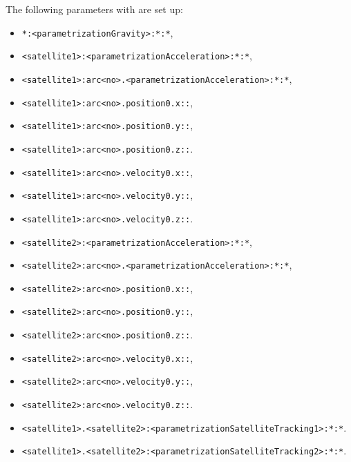 The following parameters with  are set up:
\begin{itemize}
\item \verb|*:<parametrizationGravity>:*:*|,
\item \verb|<satellite1>:<parametrizationAcceleration>:*:*|,
\item \verb|<satellite1>:arc<no>.<parametrizationAcceleration>:*:*|,
\item \verb|<satellite1>:arc<no>.position0.x::|,
\item \verb|<satellite1>:arc<no>.position0.y::|,
\item \verb|<satellite1>:arc<no>.position0.z::|.
\item \verb|<satellite1>:arc<no>.velocity0.x::|,
\item \verb|<satellite1>:arc<no>.velocity0.y::|,
\item \verb|<satellite1>:arc<no>.velocity0.z::|.
\item \verb|<satellite2>:<parametrizationAcceleration>:*:*|,
\item \verb|<satellite2>:arc<no>.<parametrizationAcceleration>:*:*|,
\item \verb|<satellite2>:arc<no>.position0.x::|,
\item \verb|<satellite2>:arc<no>.position0.y::|,
\item \verb|<satellite2>:arc<no>.position0.z::|.
\item \verb|<satellite2>:arc<no>.velocity0.x::|,
\item \verb|<satellite2>:arc<no>.velocity0.y::|,
\item \verb|<satellite2>:arc<no>.velocity0.z::|.
\item \verb|<satellite1>.<satellite2>:<parametrizationSatelliteTracking1>:*:*|.
\item \verb|<satellite1>.<satellite2>:<parametrizationSatelliteTracking2>:*:*|.
\end{itemize}


